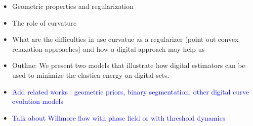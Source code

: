 \documentclass[runningheads]{llncs}
\newcommand{\todo}[1]{{\textcolor{blue}{#1}}}
\begin{document}
\begin{itemize}
\item{Geometric properties and regularization}
\item{The role of curvature} 
  
  
\item{What are the difficulties in use curvatue as a regularizer (point out convex relaxation approaches) and how a digital approach may help us }
\item{Outline: We present two models that illustrate how digital estimators can be used to minimize the elastica energy on digital sets.  }
\item{\todo{Add related works : geometric priors, binary segmentation, other digital curve evolution models}}
\item{\todo{Talk about Willmore flow with phase field or with threshold dynamics}}
  
  
  

\end{itemize}
\end{document}
